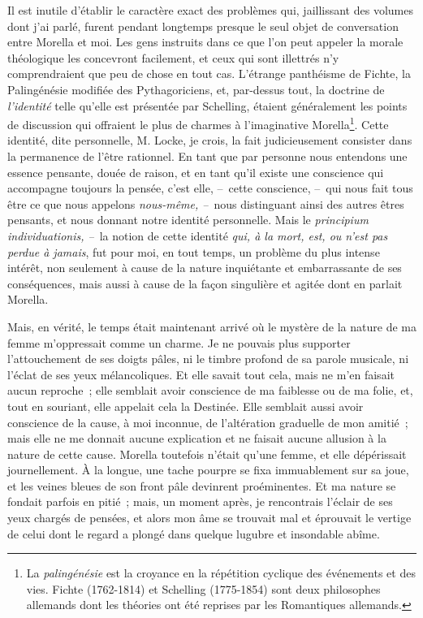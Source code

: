 \documentclass[french,twoside]{book} %
\begin{document}
Il est inutile d’établir le caractère exact des problèmes qui, jaillissant des volumes dont j’ai parlé, furent pendant longtemps presque le seul objet de conversation entre Morella et moi. Les gens instruits dans ce que l’on peut appeler la morale théologique les concevront facilement, et ceux qui sont illettrés n’y comprendraient que peu de chose en tout cas. L’étrange panthéisme de Fichte, la Palingénésie modifiée des Pythagoriciens, et, par-dessus tout, la doctrine de \emph{l’identité} telle qu’elle est présentée par Schelling, étaient généralement les points de discussion qui offraient le plus de charmes à l’imaginative Morella\footnote{La \emph{palingénésie} est la croyance en la répétition cyclique des événements et des vies. Fichte (1762-1814) et Schelling (1775-1854) sont deux philosophes allemands dont les théories ont été reprises par les Romantiques allemands.}. Cette identité, dite personnelle, M. Locke, je crois, la fait judicieusement consister dans la permanence de l’être rationnel. En tant que par personne nous entendons une essence pensante, douée de raison, et en tant qu’il existe une conscience qui accompagne toujours la pensée, c’est elle, – cette conscience, – qui nous fait tous être ce que nous appelons \emph{nous-même, –} nous distinguant ainsi des autres êtres pensants, et nous donnant notre identité personnelle. Mais le \emph{principium individuationis, –} la notion de cette identité \emph{qui, à la mort, est, ou n’est pas perdue à jamais}, fut pour moi, en tout temps, un problème du plus intense intérêt, non seulement à cause de la nature inquiétante et embarrassante de ses conséquences, mais aussi à cause de la façon singulière et agitée dont en parlait Morella.\par
Mais, en vérité, le temps était maintenant arrivé où le mystère de la nature de ma femme m’oppressait comme un charme. Je ne pouvais plus supporter l’attouchement de ses doigts pâles, ni le timbre profond de sa parole musicale, ni l’éclat de ses yeux mélancoliques. Et elle savait tout cela, mais ne m’en faisait aucun reproche ; elle semblait avoir conscience de ma faiblesse ou de ma folie, et, tout en souriant, elle appelait cela la Destinée. Elle semblait aussi avoir conscience de la cause, à moi inconnue, de l’altération graduelle de mon amitié ; mais elle ne me donnait aucune explication et ne faisait aucune allusion à la nature de cette cause. Morella toutefois n’était qu’une femme, et elle dépérissait journellement. À la longue, une tache pourpre se fixa immuablement sur sa joue, et les veines bleues de son front pâle devinrent proéminentes. Et ma nature se fondait parfois en pitié ; mais, un moment après, je rencontrais l’éclair de ses yeux chargés de pensées, et alors mon âme se trouvait mal et éprouvait le vertige de celui dont le regard a plongé dans quelque lugubre et insondable abîme.\par
\end{document}
